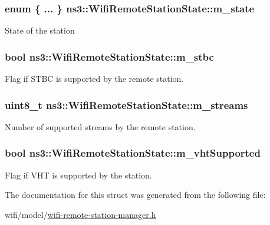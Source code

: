 \subsubsection[{\texorpdfstring{m\+\_\+state}{m_state}}]{\setlength{\rightskip}{0pt plus 5cm}enum \{ ... \}   ns3\+::\+Wifi\+Remote\+Station\+State\+::m\+\_\+state}\hypertarget{structns3_1_1WifiRemoteStationState_acfd204dd86b1e3812f594f0417f3f9d1}{}\label{structns3_1_1WifiRemoteStationState_acfd204dd86b1e3812f594f0417f3f9d1}
State of the station 
\subsubsection[{\texorpdfstring{m\+\_\+stbc}{m_stbc}}]{\setlength{\rightskip}{0pt plus 5cm}bool ns3\+::\+Wifi\+Remote\+Station\+State\+::m\+\_\+stbc}\hypertarget{structns3_1_1WifiRemoteStationState_ab3569204fee0b74e9ea330c7ec2bf6e8}{}\label{structns3_1_1WifiRemoteStationState_ab3569204fee0b74e9ea330c7ec2bf6e8}


Flag if S\+T\+BC is supported by the remote station. 

\subsubsection[{\texorpdfstring{m\+\_\+streams}{m_streams}}]{\setlength{\rightskip}{0pt plus 5cm}uint8\+\_\+t ns3\+::\+Wifi\+Remote\+Station\+State\+::m\+\_\+streams}\hypertarget{structns3_1_1WifiRemoteStationState_ab79b977be200ef95202fb2428b2abd7b}{}\label{structns3_1_1WifiRemoteStationState_ab79b977be200ef95202fb2428b2abd7b}


Number of supported streams by the remote station. 

\subsubsection[{\texorpdfstring{m\+\_\+vht\+Supported}{m_vhtSupported}}]{\setlength{\rightskip}{0pt plus 5cm}bool ns3\+::\+Wifi\+Remote\+Station\+State\+::m\+\_\+vht\+Supported}\hypertarget{structns3_1_1WifiRemoteStationState_a65514f3a3b86b2a1acb98c464866e8fd}{}\label{structns3_1_1WifiRemoteStationState_a65514f3a3b86b2a1acb98c464866e8fd}


Flag if V\+HT is supported by the station. 



The documentation for this struct was generated from the following file\+:\begin{DoxyCompactItemize}
\item 
wifi/model/\hyperlink{wifi-remote-station-manager_8h}{wifi-\/remote-\/station-\/manager.\+h}\end{DoxyCompactItemize}
